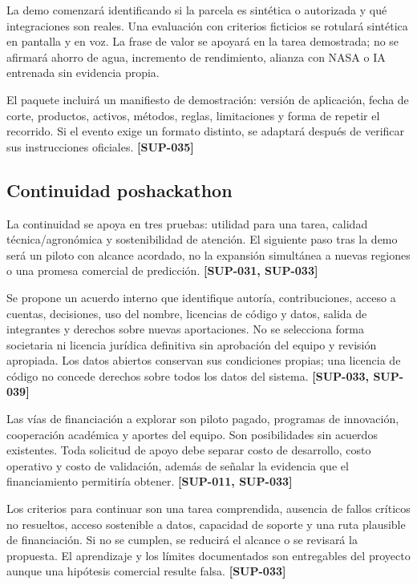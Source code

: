 \documentclass[10pt,a4paper]{article}
\begin{document}
La demo comenzará identificando si la parcela es sintética o autorizada y qué integraciones son reales. Una evaluación con criterios ficticios se rotulará sintética en pantalla y en voz. La frase de valor se apoyará en la tarea demostrada; no se afirmará ahorro de agua, incremento de rendimiento, alianza con NASA o IA entrenada sin evidencia propia.


El paquete incluirá un manifiesto de demostración: versión de aplicación, fecha de corte, productos, activos, métodos, reglas, limitaciones y forma de repetir el recorrido. Si el evento exige un formato distinto, se adaptará después de verificar sus instrucciones oficiales. \textbf{[SUP-035]}


\subsection{Continuidad poshackathon}

La continuidad se apoya en tres pruebas: utilidad para una tarea, calidad técnica/\allowbreak{}agronómica y sostenibilidad de atención. El siguiente paso tras la demo será un piloto con alcance acordado, no la expansión simultánea a nuevas regiones o una promesa comercial de predicción. \textbf{[SUP-031, SUP-033]}


Se propone un acuerdo interno que identifique autoría, contribuciones, acceso a cuentas, decisiones, uso del nombre, licencias de código y datos, salida de integrantes y derechos sobre nuevas aportaciones. No se selecciona forma societaria ni licencia jurídica definitiva sin aprobación del equipo y revisión apropiada. Los datos abiertos conservan sus condiciones propias; una licencia de código no concede derechos sobre todos los datos del sistema. \textbf{[SUP-033, SUP-039]}


Las vías de financiación a explorar son piloto pagado, programas de innovación, cooperación académica y aportes del equipo. Son posibilidades sin acuerdos existentes. Toda solicitud de apoyo debe separar costo de desarrollo, costo operativo y costo de validación, además de señalar la evidencia que el financiamiento permitiría obtener. \textbf{[SUP-011, SUP-033]}


Los criterios para continuar son una tarea comprendida, ausencia de fallos críticos no resueltos, acceso sostenible a datos, capacidad de soporte y una ruta plausible de financiación. Si no se cumplen, se reducirá el alcance o se revisará la propuesta. El aprendizaje y los límites documentados son entregables del proyecto aunque una hipótesis comercial resulte falsa. \textbf{[SUP-033]}
\end{document}
